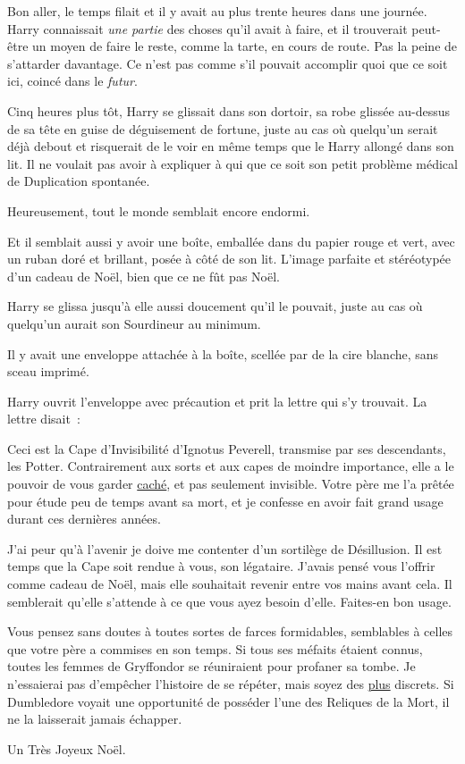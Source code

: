 Bon aller, le temps filait et il y avait au plus trente heures dans une journée. Harry connaissait \emph{une partie} des choses qu'il avait à faire, et il trouverait peut-être un moyen de faire le reste, comme la tarte, en cours de route. Pas la peine de s'attarder davantage. Ce n'est pas comme s'il pouvait accomplir quoi que ce soit ici, coincé dans le \emph{futur}.

\later


Cinq heures plus tôt, Harry se glissait dans son dortoir, sa robe glissée au-dessus de sa tête en guise de déguisement de fortune, juste au cas où quelqu'un serait déjà debout et risquerait de le voir en même temps que le Harry allongé dans son lit. Il ne voulait pas avoir à expliquer à qui que ce soit son petit problème médical de Duplication spontanée.

Heureusement, tout le monde semblait encore endormi.

Et il semblait aussi y avoir une boîte, emballée dans du papier rouge et vert, avec un ruban doré et brillant, posée à côté de son lit. L'image parfaite et stéréotypée d'un cadeau de Noël, bien que ce ne fût pas Noël.

Harry se glissa jusqu'à elle aussi doucement qu'il le pouvait, juste au cas où quelqu'un aurait son Sourdineur au minimum.

Il y avait une enveloppe attachée à la boîte, scellée par de la cire blanche, sans sceau imprimé.

Harry ouvrit l'enveloppe avec précaution et prit la lettre qui s'y trouvait. La lettre disait~:
\begin{writtenNote}

Ceci est la Cape d'Invisibilité d'Ignotus Peverell, transmise par ses descendants, les Potter. Contrairement aux sorts et aux capes de moindre importance, elle a le pouvoir de vous garder \underline{caché}, et pas seulement invisible. Votre père me l'a prêtée pour étude peu de temps avant sa mort, et je confesse en avoir fait grand usage durant ces dernières années.

J'ai peur qu'à l'avenir je doive me contenter d'un sortilège de Désillusion. Il est temps que la Cape soit rendue à vous, son légataire. J'avais pensé vous l'offrir comme cadeau de Noël, mais elle souhaitait revenir entre vos mains avant cela. Il semblerait qu'elle s'attende à ce que vous ayez besoin d'elle. Faites-en bon usage.

Vous pensez sans doutes à toutes sortes de farces formidables, semblables à celles que votre père a commises en son temps. Si tous ses méfaits étaient connus, toutes les femmes de Gryffondor se réuniraient pour profaner sa tombe. Je n'essaierai pas d'empêcher l'histoire de se répéter, mais soyez des \underline{plus} discrets. Si Dumbledore voyait une opportunité de posséder l'une des Reliques de la Mort, il ne la laisserait jamais échapper.

Un Très Joyeux Noël.

\end{writtenNote}

